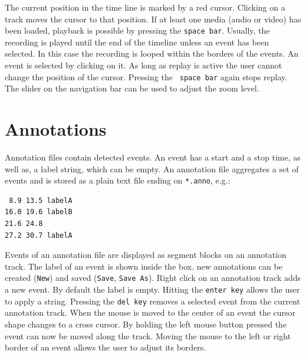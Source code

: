 The current position in the time line is marked by a red cursor. Clicking on a track moves the cursor to that position. If at least one media (audio or video) has been loaded, playback is possible by pressing the \texttt{space bar}. Usually, the recording is played until the end of the timeline unless an event has been selected. In this case the recording is looped within the borders of the events. An event is selected by clicking on it. As long as replay is active the user cannot change the position of the cursor. Pressing the \texttt{ space bar} again stops replay. The slider on the navigation bar can be used to adjust the zoom level.

\section{Annotations}\label{lab:view_events}

Annotation files contain detected events. An event has a start and a stop time, as well as, a label string, which can be empty. An annotation file aggregates a set of events and is stored as a plain text file ending on \texttt{*.anno}, e.g.:

\begin{verbatim}
 8.9 13.5 labelA
16.0 19.6 labelB
21.6 24.8
27.2 30.7 labelA
\end{verbatim}

 Events of an annotation file are displayed as segment blocks on an annotation track. The label of an event is shown inside the box. new annotations can be created (\texttt{New}) and saved (\texttt{Save}, \texttt{Save As}). Right click on an annotation track adds a new event. By default the label is empty. Hitting the \texttt{enter key} allows the user to apply a string. Pressing the \texttt{del key} removes a selected event from the current annotation track. When the mouse is moved to the center of an event the cursor shape changes to a cross cursor. By holding the left mouse button pressed the event can now be moved along the track. Moving the mouse to the left or right border of an event allows the user to adjust its borders.

